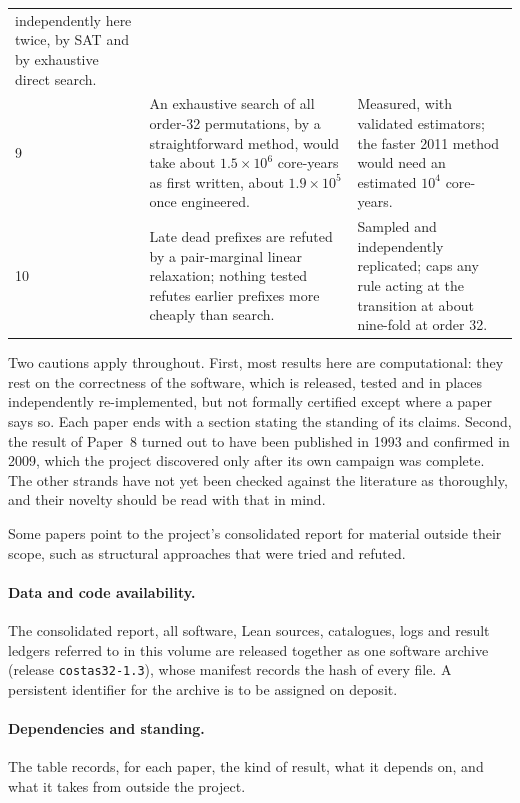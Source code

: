 \documentclass[11pt,a4paper,oneside]{report}
\theoremstyle{definition}
\begin{document}
\begin{center}
\begin{tabular}{@{}p{}>{\raggedright\arraybackslash}p{}>{\raggedright\arraybackslash}p{}@{}}
independently here twice, by SAT and by exhaustive direct search. \\
9 & An exhaustive search of all order-32 permutations, by a straightforward method, would take about $1.5\times10^6$ core-years as first written, about $1.9\times10^5$ once engineered. & Measured, with validated estimators; the faster 2011 method would need an estimated $10^4$ core-years. \\
10 & Late dead prefixes are refuted by a pair-marginal linear relaxation; nothing tested refutes earlier prefixes more cheaply than search. & Sampled and independently replicated; caps any rule acting at the transition at about nine-fold at order 32. \\
\bottomrule
\end{tabular}
\end{center}

Two cautions apply throughout. First, most results here are computational: they rest on the
correctness of the software, which is released, tested and in places independently re-implemented,
but not formally certified except where a paper says so. Each paper ends with a section stating
the standing of its claims. Second, the result of Paper~8 turned out to have been published in 1993
and confirmed in 2009, which the project discovered only after its own campaign was complete. The
other strands have not yet been checked against the literature as thoroughly, and their novelty
should be read with that in mind.

Some papers point to the project's consolidated report for material outside their scope, such as
structural approaches that were tried and refuted.

\paragraph{Data and code availability.} The consolidated report, all software, Lean sources,
catalogues, logs and result ledgers referred to in this volume are released together as one software
archive (release \texttt{costas32-1.3}), whose manifest records the hash of every file. A persistent
identifier for the archive is to be assigned on deposit.

\paragraph{Dependencies and standing.} The table records, for each paper, the kind of result, what it
depends on, and what it takes from outside the project.
\end{document}
